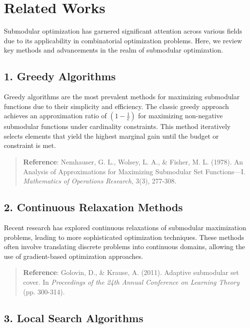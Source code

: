 \section{Related Works}
Submodular optimization has garnered significant attention across various fields due to its applicability in combinatorial optimization problems. Here, we review key methods and advancements in the realm of submodular optimization.

\subsection*{1. Greedy Algorithms}

Greedy algorithms are the most prevalent methods for maximizing submodular functions due to their simplicity and efficiency. The classic greedy approach achieves an approximation ratio of \( (1 - \frac{1}{e}) \) for maximizing non-negative submodular functions under cardinality constraints. This method iteratively selects elements that yield the highest marginal gain until the budget or constraint is met.

\begin{quote}
	\textbf{Reference}: Nemhauser, G. L., Wolsey, L. A., \& Fisher, M. L. (1978). An Analysis of Approximations for Maximizing Submodular Set Functions—I. \textit{Mathematics of Operations Research}, 3(3), 277-308.
\end{quote}

\subsection*{2. Continuous Relaxation Methods}

Recent research has explored continuous relaxations of submodular maximization problems, leading to more sophisticated optimization techniques. These methods often involve translating discrete problems into continuous domains, allowing the use of gradient-based optimization approaches.

\begin{quote}
	\textbf{Reference}: Golovin, D., \& Krause, A. (2011). Adaptive submodular set cover. In \textit{Proceedings of the 24th Annual Conference on Learning Theory} (pp. 300-314).
\end{quote}

\subsection*{3. Local Search Algorithms}

